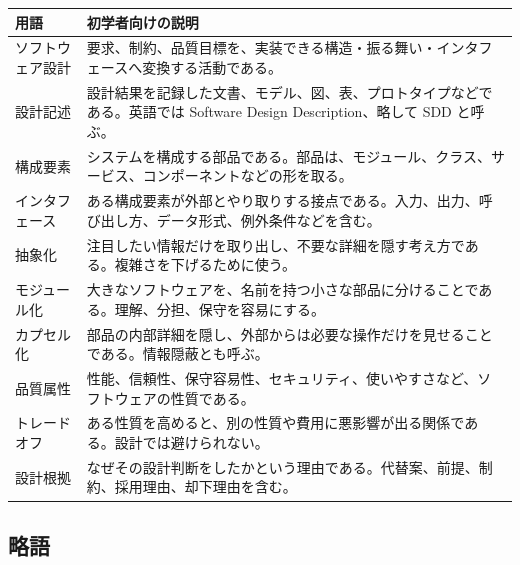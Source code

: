 \documentclass[10.5pt,a4paper]{ltjsarticle}
\begin{document}
\begin{tabularx}{\linewidth}{L{34mm}Y}
\toprule
\textbf{用語} & \textbf{初学者向けの説明} \\
\midrule
ソフトウェア設計 & 要求、制約、品質目標を、実装できる構造・振る舞い・インタフェースへ変換する活動である。 \\
設計記述 & 設計結果を記録した文書、モデル、図、表、プロトタイプなどである。英語では Software Design Description、略して SDD と呼ぶ。 \\
構成要素 & システムを構成する部品である。部品は、モジュール、クラス、サービス、コンポーネントなどの形を取る。 \\
インタフェース & ある構成要素が外部とやり取りする接点である。入力、出力、呼び出し方、データ形式、例外条件などを含む。 \\
抽象化 & 注目したい情報だけを取り出し、不要な詳細を隠す考え方である。複雑さを下げるために使う。 \\
モジュール化 & 大きなソフトウェアを、名前を持つ小さな部品に分けることである。理解、分担、保守を容易にする。 \\
カプセル化 & 部品の内部詳細を隠し、外部からは必要な操作だけを見せることである。情報隠蔽とも呼ぶ。 \\
品質属性 & 性能、信頼性、保守容易性、セキュリティ、使いやすさなど、ソフトウェアの性質である。 \\
トレードオフ & ある性質を高めると、別の性質や費用に悪影響が出る関係である。設計では避けられない。 \\
設計根拠 & なぜその設計判断をしたかという理由である。代替案、前提、制約、採用理由、却下理由を含む。 \\
\bottomrule
\end{tabularx}

\subsection*{略語}
\end{document}
